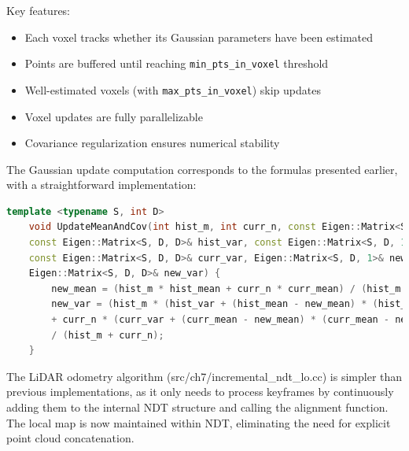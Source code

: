 Key features:
\begin{itemize}
	\item Each voxel tracks whether its Gaussian parameters have been estimated
	\item Points are buffered until reaching \texttt{min\_pts\_in\_voxel} threshold
	\item Well-estimated voxels (with \texttt{max\_pts\_in\_voxel}) skip updates
	\item Voxel updates are fully parallelizable
	\item Covariance regularization ensures numerical stability
\end{itemize}

The Gaussian update computation corresponds to the formulas presented earlier, with a straightforward implementation:

\begin{lstlisting}[language=c++,caption=src/common/math\_utils.h]
	template <typename S, int D>
	void UpdateMeanAndCov(int hist_m, int curr_n, const Eigen::Matrix<S, D, 1>& hist_mean,
	const Eigen::Matrix<S, D, D>& hist_var, const Eigen::Matrix<S, D, 1>& curr_mean,
	const Eigen::Matrix<S, D, D>& curr_var, Eigen::Matrix<S, D, 1>& new_mean,
	Eigen::Matrix<S, D, D>& new_var) {
		new_mean = (hist_m * hist_mean + curr_n * curr_mean) / (hist_m + curr_n);
		new_var = (hist_m * (hist_var + (hist_mean - new_mean) * (hist_mean - new_mean).transpose()) 
		+ curr_n * (curr_var + (curr_mean - new_mean) * (curr_mean - new_mean).transpose()))
		/ (hist_m + curr_n);
	}
\end{lstlisting}

The LiDAR odometry algorithm (src/ch7/incremental\_ndt\_lo.cc) is simpler than previous implementations, as it only needs to process keyframes by continuously adding them to the internal NDT structure and calling the alignment function. The local map is now maintained within NDT, eliminating the need for explicit point cloud concatenation.

